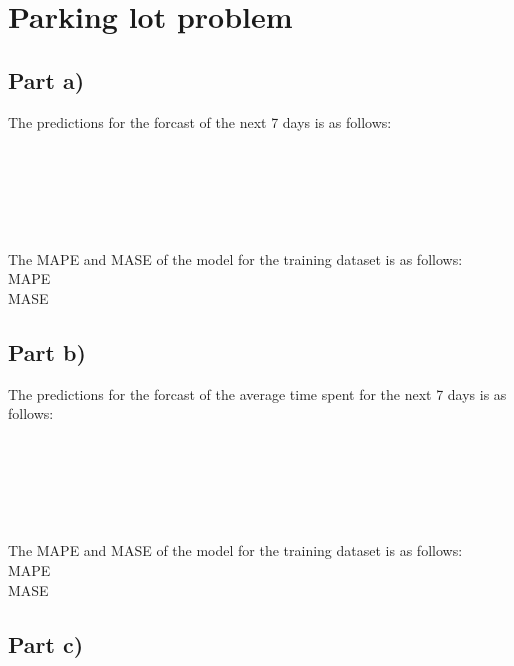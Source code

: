 \section{Parking lot problem}
\subsection{Part a)}
The predictions for the forcast of the next 7 days is as follows:
\\
\\
\\
\\
\\
\\
\\


The MAPE and MASE of the model for the training dataset is as follows: \\
MAPE \\
MASE \\


\subsection{Part b)}
The predictions for the forcast of the average time spent for the  next 7 days is as follows:
\\
\\
\\
\\
\\
\\
\\


The MAPE and MASE of the model for the training dataset is as follows: \\
MAPE \\
MASE \\

\subsection{Part c)}
